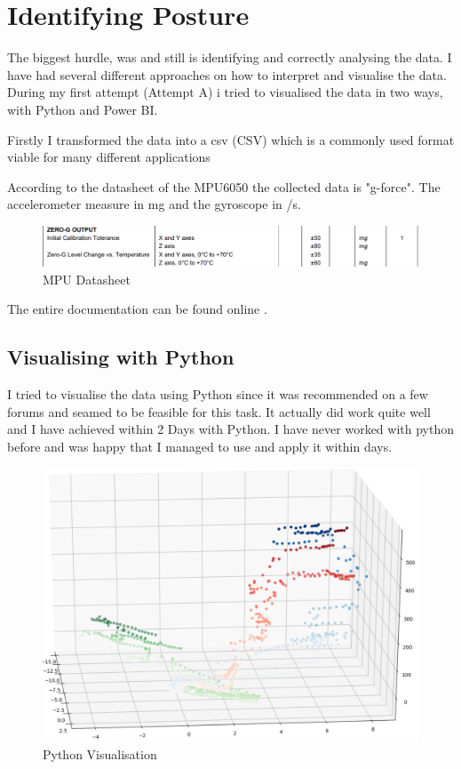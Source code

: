 \section{Identifying Posture}

The biggest hurdle, was and still is identifying and correctly analysing the data. I have had several different approaches on how to interpret and visualise the data. During my first attempt (Attempt A) i tried to visualised the data in two ways, with Python and Power BI.

Firstly I transformed the data into a \acrshort{csv} (\gls{CSV}) which is a commonly used format viable for many different applications

According to the datasheet of the MPU6050 the collected data is "g-force". The accelerometer measure in mg and the gyroscope in \degree/s. 

\begin{figure}[h]
\begin{center}
\includegraphics[width=\linewidth]{images/MPU6050_DATA.png}
  \end{center}
  \caption{MPU Datasheet}
  \label{fig:MPUDatasheet}
\end{figure}

The entire documentation can be found online \cite{MPU6000D59:online}.

\subsection{Visualising with Python}

I tried to visualise the data using \gls{Python} since it was recommended on a few forums and seamed to be feasible for this task. It actually did work quite well and I have achieved within 2 Days with Python. I have never worked with python before and was happy that I managed to use and apply it within days. 

\begin{figure}[h]
\begin{center}
\includegraphics[width=0.6\linewidth]{images/PyVisualisation.png}
  \end{center}
  \caption{Python Visualisation}
  \label{fig:PythonVisualisation}
\end{figure}

